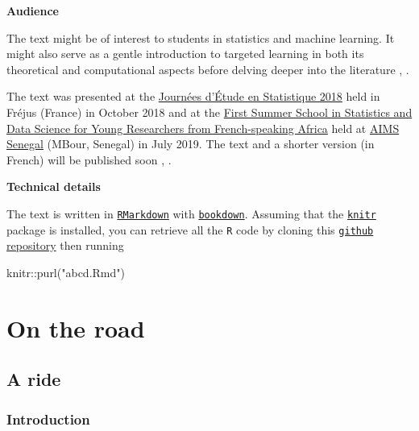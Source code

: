 \documentclass[
  11pt,
  openright,twoside]{book}
\newenvironment{Shaded}{\begin{snugshade}}{\end{snugshade}}
\newcommand{\FunctionTok}[1]{\textcolor[rgb]{0.00,0.00,0.00}{#1}}
\newcommand{\NormalTok}[1]{#1}
\newcommand{\SpecialCharTok}[1]{\textcolor[rgb]{0.00,0.00,0.00}{#1}}
\newcommand{\StringTok}[1]{\textcolor[rgb]{0.31,0.60,0.02}{#1}}
\theoremstyle{definition}
\theoremstyle{definition}
\theoremstyle{definition}
\theoremstyle{definition}
\theoremstyle{remark}
\begin{document}
\textbf{Audience}

The text might be of interest to students in statistics and machine
learning. It might also serve as a gentle introduction to targeted learning in
both its theoretical and computational aspects before delving deeper into the
literature \citep{TMLEbook11}, \citep{TMLEbook18}.

The text was presented at the \href{https://www.sfds.asso.fr/fr/group/activites_et_parrainages/608-journees_detude_en_statistique/}{Journées d'Étude en Statistique
2018}
held in Fréjus (France) in October 2018 and at the \href{https://ehermellin.github.io/conf_sfds/index.html}{First Summer School in
Statistics and Data Science for Young Researchers from French-speaking
Africa} held at \href{https://aims-senegal.org/}{AIMS
Senegal} (MBour, Senegal) in July 2019. The text
and a shorter version (in French) will be published soon \citep{BC20}, \citep{BCJES20}.

\textbf{Technical details}

The text is written in \href{https://rmarkdown.rstudio.com}{\texttt{RMarkdown}}
with \href{https://bookdown.org}{\texttt{bookdown}}. Assuming that
the \href{https://yihui.name/knitr/}{\texttt{knitr}} package is installed, you can
retrieve all the \texttt{R} code by cloning this \href{https://github.com/achambaz/tlride}{\texttt{github}
repository} then running

\begin{Shaded}
\begin{Highlighting}[]
\NormalTok{knitr}\SpecialCharTok{::}\FunctionTok{purl}\NormalTok{(}\StringTok{"abcd.Rmd"}\NormalTok{)}
\end{Highlighting}
\end{Shaded}

\hypertarget{part-on-the-road}{%
\part{On the road}\label{part-on-the-road}}

\hypertarget{a-ride}{%
\chapter{A ride}\label{a-ride}}

\hypertarget{introduction}{%
\section{Introduction}\label{introduction}}
\end{document}
